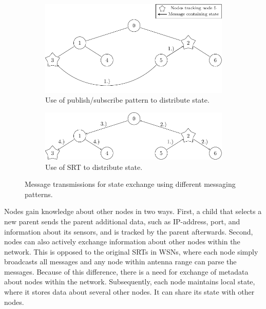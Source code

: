   \begin{figure}[h]          
    \begin{subfigure}{\textwidth}
      \centering
      \includegraphics[width=\textwidth]{img/state-exchange/pub_sub_exchange.pdf}
      \caption{Use of publish/subscribe pattern to distribute state.}
    \end{subfigure}  
    \newline 
    \begin{subfigure}{\textwidth}
      \centering
      \includegraphics[width=\textwidth]{img/state-exchange/srt_exchange.pdf}
      \caption{Use of SRT to distribute state.}
    \end{subfigure}
    \caption{Message transmissions for state exchange using different messaging patterns.}
    \label{fig:state-exchange}
  \end{figure}

  Nodes gain knowledge about other nodes in two ways. First, a child that selects a new parent sends the parent additional data, such as IP-address, port, and information about its sensors, and is tracked by the parent afterwards. Second, nodes can also actively exchange information about other nodes within the network. This is opposed to the original SRTs in WSNs, where each node simply broadcasts all messages and any node within antenna range can parse the messages. Because of this difference, there is a need for exchange of metadata about nodes within the network. Subsequently, each node maintains local state, where it stores data about several other nodes. It can share its state with other nodes. 
  
